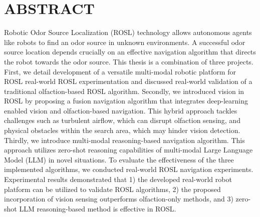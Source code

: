 \chapter*{ABSTRACT}

{Robotic Odor Source Localization (ROSL) technology allows autonomous agents like robots to find an odor source in unknown environments. A successful odor source location depends crucially on an effective navigation algorithm that directs the robot towards the odor source. This thesis is a combination of three projects. First, we detail development of a versatile multi-modal robotic platform for ROSL real-world ROSL experimentation and discussed real-world validation of a traditional olfaction-based ROSL algorithm. Secondly, we introduced vision in ROSL by proposing a fusion navigation algorithm that integrates deep-learning enabled vision and olfaction-based navigation. This hybrid approach tackles challenges such as turbulent airflow, which can disrupt olfaction sensing, and physical obstacles within the search area, which may hinder vision detection. Thirdly, we introduce multi-modal reasoning-based navigation algorithm. This approach utilizes zero-shot reasoning capabilities of multi-modal Large Language Model (LLM) in novel situations. To evaluate the effectiveness of the three implemented algorithms, we conducted real-world ROSL navigation experiments. Experimental results demonstrated that 1) the developed real-world robot platform can be utilized to validate ROSL algorithms, 2) the proposed incorporation of vision sensing  outperforms olfaction-only methods, and 3) zero-shot LLM reasoning-based method is effective in ROSL.}
